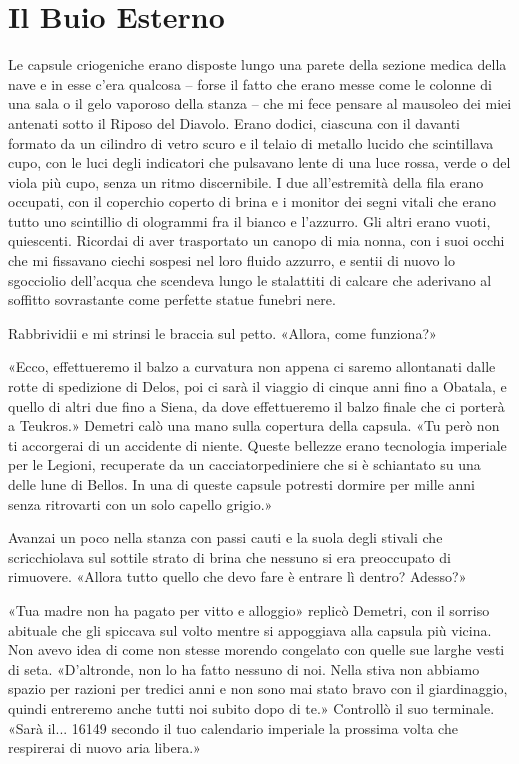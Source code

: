 \chapter{Il Buio Esterno}

Le capsule criogeniche erano disposte lungo una parete della sezione
medica della nave e in esse c'era qualcosa -- forse il fatto che erano
messe come le colonne di una sala o il gelo vaporoso della stanza -- che
mi fece pensare al mausoleo dei miei antenati sotto il Riposo del
Diavolo. Erano dodici, ciascuna con il davanti formato da un cilindro di
vetro scuro e il telaio di metallo lucido che scintillava cupo, con le
luci degli indicatori che pulsavano lente di una luce rossa, verde o del
viola più cupo, senza un ritmo discernibile. I due all'estremità della
fila erano occupati, con il coperchio coperto di brina e i monitor dei
segni vitali che erano tutto uno scintillio di ologrammi fra il bianco e
l'azzurro. Gli altri erano vuoti, quiescenti. Ricordai di aver
trasportato un canopo di mia nonna, con i suoi occhi che mi fissavano
ciechi sospesi nel loro fluido azzurro, e sentii di nuovo lo sgocciolio
dell'acqua che scendeva lungo le stalattiti di calcare che aderivano al
soffitto sovrastante come perfette statue funebri nere.

Rabbrividii e mi strinsi le braccia sul petto. «Allora, come funziona?»

«Ecco, effettueremo il balzo a curvatura non appena ci saremo
allontanati dalle rotte di spedizione di Delos, poi ci sarà il viaggio
di cinque anni fino a Obatala, e quello di altri due fino a Siena, da
dove effettueremo il balzo finale che ci porterà a Teukros.» Demetri
calò una mano sulla copertura della capsula. «Tu però non ti accorgerai
di un accidente di niente. Queste bellezze erano tecnologia imperiale
per le Legioni, recuperate da un cacciatorpediniere che si è schiantato
su una delle lune di Bellos. In una di queste capsule potresti dormire
per mille anni senza ritrovarti con un solo capello grigio.»

Avanzai un poco nella stanza con passi cauti e la suola degli stivali
che scricchiolava sul sottile strato di brina che nessuno si era
preoccupato di rimuovere. «Allora tutto quello che devo fare è entrare
lì dentro? Adesso?»

«Tua madre non ha pagato per vitto e alloggio» replicò Demetri, con il
sorriso abituale che gli spiccava sul volto mentre si appoggiava alla
capsula più vicina. Non avevo idea di come non stesse morendo congelato
con quelle sue larghe vesti di seta. «D'altronde, non lo ha fatto
nessuno di noi. Nella stiva non abbiamo spazio per razioni per tredici
anni e non sono mai stato bravo con il giardinaggio, quindi entreremo
anche tutti noi subito dopo di te.» Controllò il suo terminale. «Sarà
il... 16149 secondo il tuo calendario imperiale la prossima volta che
respirerai di nuovo aria libera.»


